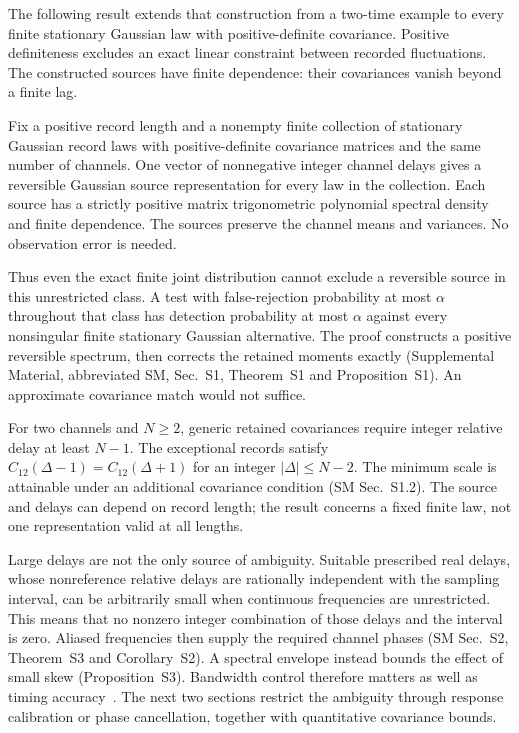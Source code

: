 

The following result extends that construction from a two-time example to every finite stationary Gaussian law with positive-definite covariance. Positive definiteness excludes an exact linear constraint between recorded fluctuations. The constructed sources have finite dependence: their covariances vanish beyond a finite lag.
\begin{theorem}\label{thm:main-finite-law}
Fix a positive record length and a nonempty finite collection of stationary Gaussian record laws with positive-definite covariance matrices and the same number of channels. One vector of nonnegative integer channel delays gives a reversible Gaussian source representation for every law in the collection. Each source has a strictly positive matrix trigonometric polynomial spectral density and finite dependence. The sources preserve the channel means and variances. No observation error is needed.
\end{theorem}
Thus even the exact finite joint distribution cannot exclude a reversible source in this unrestricted class. A test with false-rejection probability at most $\alpha$ throughout that class has detection probability at most $\alpha$ against every nonsingular finite stationary Gaussian alternative. The proof constructs a positive reversible spectrum, then corrects the retained moments exactly (Supplemental Material, abbreviated SM, Sec.~S1, Theorem~S1 and Proposition~S1). An approximate covariance match would not suffice.

For two channels and $N\ge2$, generic retained covariances require integer relative delay at least $N-1$. The exceptional records satisfy $C_{12}(\Delta-1)=C_{12}(\Delta+1)$ for an integer $|\Delta|\le N-2$. The minimum scale is attainable under an additional covariance condition (SM Sec.~S1.2). The source and delays can depend on record length; the result concerns a fixed finite law, not one representation valid at all lengths.

Large delays are not the only source of ambiguity. Suitable prescribed real delays, whose nonreference relative delays are rationally independent with the sampling interval, can be arbitrarily small when continuous frequencies are unrestricted. This means that no nonzero integer combination of those delays and the interval is zero. Aliased frequencies then supply the required channel phases (SM Sec.~S2, Theorem~S3 and Corollary~S2). A spectral envelope instead bounds the effect of small skew (Proposition~S3). Bandwidth control therefore matters as well as timing accuracy~\cite{hansenSargent1983,parratobar,rutten}. The next two sections restrict the ambiguity through response calibration or phase cancellation, together with quantitative covariance bounds.
